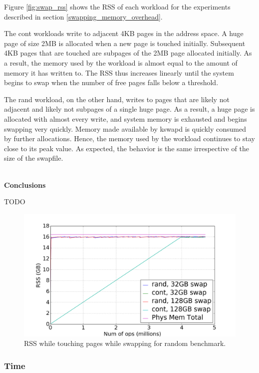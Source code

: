 \documentclass[twocolumn,11pt]{article}
\begin{document}
Figure \ref{fig:swap_rss} shows the RSS of each workload for the
experiments described in section \ref{swapping_memory_overhead}. 

The
cont workloads write to  adjacent 4KB pages in the address space. A
huge page of size 2MB is allocated when a new page is touched
initially. Subsequent 4KB pages that are touched are subpages of the 2MB page
allocated initially. As a result, the memory used by the workload is almost
equal to the amount of memory it has written to. The RSS thus increases linearly
until the system begins to swap when the number of free pages falls below a
threshold. 

The rand workload, on the other hand, writes to pages that are likely
not adjacent and likely not subpages of a single huge page. As a result, a huge
page is allocated with almost every write, and system memory is exhausted and
begins swapping very quickly. Memory made available by kswapd is
quickly consumed by further allocations. Hence, the memory used by the workload
continues to stay close to its peak value. As expected, the behavior is the same
irrespective of the size of the swapfile.

~\\ \textbf{Conclusions} 

TODO

\begin{figure}
    \includegraphics[width=\columnwidth]{figures/swap_rss}
    \caption{RSS while touching pages while swapping for random benchmark.}
    \label{swap_rss}
\end{figure}

\subsubsection{Time}
\end{document}

